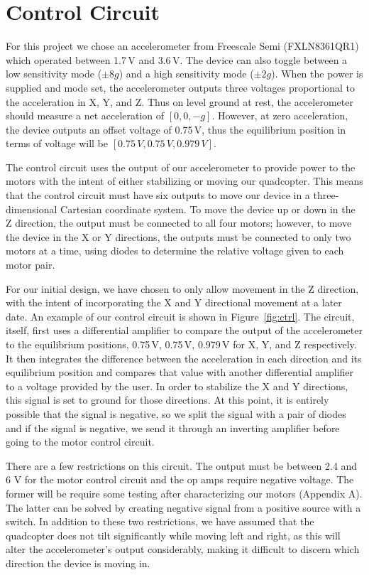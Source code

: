 \section{Control Circuit}

For this project we chose an accelerometer from Freescale Semi (FXLN8361QR1) which operated between 1.7\,V and 3.6\,V. The device can also toggle between a low sensitivity mode ($\pm8g$) and a high sensitivity mode ($\pm2g$). When the power is supplied and mode set, the accelerometer outputs three voltages proportional to the acceleration in X, Y, and Z. Thus on level ground at rest, the accelerometer should measure a net acceleration of $[0,0,-g]$. However, at zero acceleration, the device outputs an offset voltage of 0.75\,V, thus the equilibrium position in terms of voltage will be $[0.75\,V,0.75\,V,0.979\,V]$.

The control circuit uses the output of our accelerometer to provide power to the motors with the intent of either stabilizing or moving our quadcopter. This means that the control circuit must have six outputs to move our device in a three-dimensional Cartesian coordinate system. To move the device up or down in the Z direction, the output must be connected to all four motors; however, to move the device in the X or Y directions, the outputs must be connected to only two motors at a time, using diodes to determine the relative voltage given to each motor pair. 

For our initial design, we have chosen to only allow movement in the Z direction, with the intent of incorporating the X and Y directional movement at a later date. An example of our control circuit is shown in Figure~\ref{fig:ctrl}. The circuit, itself, first uses a differential amplifier to compare the output of the accelerometer to the equilibrium positions, 0.75\,V, 0.75\,V, 0.979\,V for X, Y, and Z respectively. It then integrates the difference between the acceleration in each direction and its equilibrium position and compares that value with another differential amplifier to a voltage provided by the user. In order to stabilize the X and Y directions, this signal is set to ground for those directions. At this point, it is entirely possible that the signal is negative, so we split the signal with a pair of diodes and if the signal is negative, we send it through an inverting amplifier before going to the motor control circuit.

There are a few restrictions on this circuit. The output must be between 2.4 and 6 V for the motor control circuit and the op amps require negative voltage. The former will be require some testing after characterizing our motors (Appendix A). The latter can be solved by creating negative signal from a positive source with a switch. In addition to these two restrictions, we have assumed that the quadcopter does not tilt significantly while moving left and right, as this will alter the accelerometer's output considerably, making it difficult to discern which direction the device is moving in.

